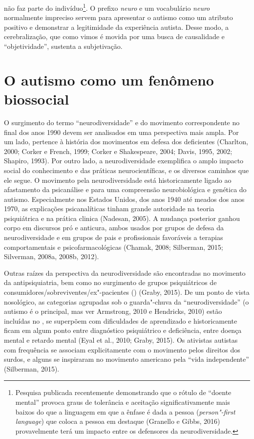 não faz parte do indivíduo\footnote[9]{Pesquisa publicada recentemente demonstrando que o rótulo de
``doente mental'' provoca graus de tolerância e aceitação
significativamente mais baixos do que a linguagem em que a ênfase é dada
a pessoa (\emph{person"-first language}) que coloca a pessoa em destaque
(Granello e Gibbs, 2016) provavelmente terá um impacto entre os
defensores da neurodiversidade.}. O prefixo \emph{neuro} e
um vocabulário \emph{neuro} normalmente impreciso servem para apresentar
o autismo como um atributo positivo e demonstrar a legitimidade da
experiência autista. Desse modo, a cerebralização, que como vimos é
movida por uma busca de causalidade e ``objetividade'', sustenta a
subjetivação.

\section{O autismo como um fenômeno biossocial}

O surgimento do termo ``neurodiversidade'' e do movimento correspondente
no final dos anos 1990 devem ser analisados em uma perspectiva mais
ampla. Por um lado, pertence à história dos movimentos em defesa dos
deficientes (Charlton, 2000; Corker e French, 1999; Corker e
Shakespeare, 2004; Davis, 1995, 2002; Shapiro, 1993). Por outro lado, a
neurodiversidade exemplifica o amplo impacto social do conhecimento e
das práticas neurocientíficas, e os diversos caminhos que ele segue. O
movimento pela neurodiversidade está historicamente ligado ao
afastamento da psicanálise e para uma compreensão neurobiológica e
genética do autismo. Especialmente nos Estados Unidos, dos anos 1940 até
meados dos anos 1970, as explicações psicanalíticas tinham grande
autoridade na teoria psiquiátrica e na prática clinica (Nadesan, 2005).
A mudança posterior ganhou corpo em discursos pró e anticura, ambos
usados por grupos de defesa da neurodiversidade e em grupos de pais e
profissionais favoráveis a terapias comportamentais e
psicofarmacológicas (Chamak, 2008; Silberman, 2015; Silverman, 2008a,
2008b, 2012).

Outras raízes da perspectiva da neurodiversidade são encontradas no
movimento da antipsiquiatria, bem como no surgimento de grupos
psiquiátricos de consumidores/sobreviventes/ex"-pacientes () (Graby,
2015). De um ponto de vista nosológico, as categorias agrupadas sob o
guarda"-chuva da ``neurodiversidade'' (o autismo é o principal, mas ver
Armstrong, 2010 e Hendricks, 2010) estão incluídas no \emph{}, se
superpõem com dificuldades de aprendizado e historicamente ficam em
algum ponto entre diagnóstico psiquiátrico e deficiência, entre doença
mental e retardo mental (Eyal et al., 2010; Graby, 2015). Os ativistas
autistas com frequência se associam explicitamente com o movimento pelos
direitos dos surdos, e alguns se inspiraram no movimento americano pela
``vida independente'' (Silberman, 2015).

